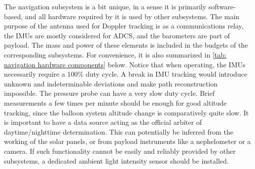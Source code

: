 The navigation subsystem is a bit unique, in a sense it is primarily software-based, and all hardware required by it is used by other subsystems. The main purpose of the antenna used for Doppler tracking is as a communications relay, the IMUs are mostly considered for ADCS, and the barometers are part of payload. The mass and power of these elements is included in the budgets of the corresponding subsystems. For convenience, it is also summarized in \autoref{tab: navigation hardware components} below. Notice that when operating, the IMUs necessarily require a 100\% duty cycle. A break in IMU tracking would introduce unknown and indeterminable deviations and make path reconstruction impossible. The pressure probe can have a very slow duty cycle. Brief measurements a few times per minute should be enough for good altitude tracking, since the balloon system altitude change is comparatively quite slow. It is important to have a data source acting as the official arbiter of daytime/nighttime determination. This can potentially be inferred from the working of the solar panels, or from payload instruments like a nephelometer or a camera. If such functionality cannot be easily and reliably provided by other subsystems, a dedicated ambient light intensity sensor should be installed.


\begin{table}[H]
\centering
\caption{Guidance \& Navigation Subsystem Components}
\label{tab: navigation hardware components}
\end{table}

